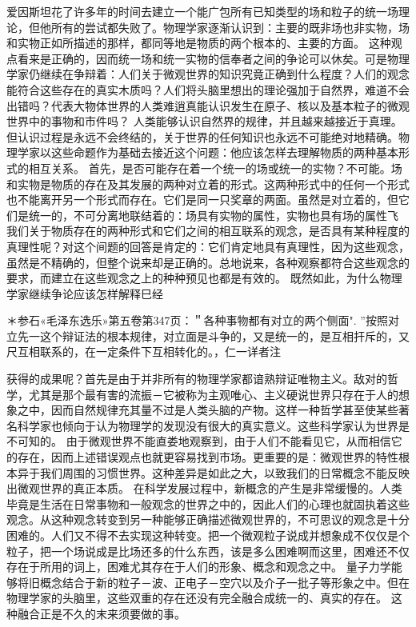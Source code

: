 爱因斯坦花了许多年的时间去建立一个能广包所有已知类型的场和粒子的统一场理论，但他所有的尝试都失败了。物理学家逐渐认识到：主要的既非场也非实物，场和实物正如所描述的那样，都同等地是物质的两个根本的、主要的方面。
这种观点看来是正确的，因而统一场和统一实物的信奉者之间的争论可以休矣。可是物理学家仍继续在争辩着：人们关于微观世界的知识究竟正确到什么程度？人们的观念能符合这些存在的真实木质吗？人们将头脑里想出的理论强加于自然界，难道不会出错吗？代表大物体世界的人类难逍真能认识发生在原子、核以及基本粒子的微观世界中的事物和市件吗？
人类能够认识自然界的规律，并且越来越接近于真理。
但认识过程是永远不会终结的，关于世界的任何知识也永远不可能绝对地精确。物理学家以这些命题作为基础去接近这个问题：他应该怎样去理解物质的两种基本形式的相互关系。
首先，是否可能存在着一个统一的场或统一的实物？不可能。场和实物是物质的存在及其发展的两种对立着的形式。这两种形式中的任何一个形式也不能离开另一个形式而存在。它们是同一只奖章的两面。虽然是对立着的，但它们是统一的，不可分离地联结着的：场具有实物的属性，实物也具有场的属性飞
我们关于物质存在的两种形式和它们之间的相互联系的观念，是否具有某种程度的真理性呢？对这个间题的回答是肯定的：它们肯定地具有真理性，因为这些观念，虽然是不精确的，但整个说来却是正确的。总地说来，各种观察都符合这些观念的要求，而建立在这些观念之上的种种预见也都是有效的。
既然如此，为什么物理学家继续争论应该怎样解释巳经

＊参石«毛泽东选乐»第五卷第347页：＂各种事物都有对立的两个侧面".
”按照对立先一这个辩证法的根本规律，对立面是斗争的，又是统一的，是互相扞斥的，又尺互相联系的，在一定条件下互相转化的。，仁一详者注


获得的成果呢？首先是由于并非所有的物理学家都谙熟辩证唯物主义。敌对的哲学，尤其是那个最有害的流振－它被称为主观唯心、主义硬说世界只存在于人的想象之中，因而自然规律充其量不过是人类头脑的产物。这样一种哲学甚至使某些著名科学家也倾向于认为物理学的发现没有很大的真实意义。这些科学家认为世界是不可知的。
由于微观世界不能直娄地观察到，由于人们不能看见它，从而相信它的存在，因而上述错误观点也就更容易找到市场。更重要的是：微观世界的特性根本异于我们周围的习惯世界。这种差异是如此之大，以致我们的日常概念不能反映出微观世界的真正本质。
在科学发展过程中，新概念的产生是非常缓慢的。人类毕竟是生活在日常事物和一般观念的世界之中的，因此人们的心理也就固执着这些观念。从这种观念转变到另一种能够正确描述微观世界的，不可思议的观念是十分困难的。人们又不得不去实现这种转变。把一个微观粒子说成并想象成不仅仅是个粒子，把一个场说成是比场还多的什么东西，该是多么困难啊而这里，困难还不仅存在于所用的词上，困难尤其存在于人们的形象、概念和观念之中。
量子力学能够将旧概念结合于新的粒子－波、正电子－空穴以及介子一批子等形象之中。但在物理学家的头脑里，这些双重的存在还没有完全融合成统一的、真实的存在。
这种融合正是不久的末来须要做的事。

